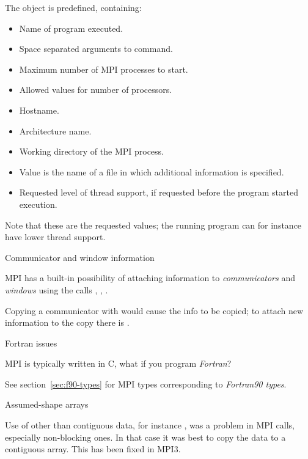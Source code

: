 The object  is predefined, containing:
\begin{itemize}
\item {}
  Name of program executed.
\item  {}
  Space separated arguments to command.
\item  {}
  Maximum number of MPI processes to start.
\item   {}
  Allowed values for number of processors.
\item   {}
  Hostname.
\item   {}
  Architecture name.
\item   {}
  Working directory of the MPI process.
\item   {}
  Value is the name of a file in which additional information is specified.
\item   {}
  Requested level of thread support, if requested before the program started execution.
\end{itemize}
Note that these are the requested values; the running program can for instance
have lower thread support.

 {Communicator and window information}

MPI has a built-in possibility of attaching information to
\emph{communicators}
and
\emph{windows}
using the calls
,
,
.

Copying a communicator with  would cause
the info to be copied; to attach new information to the copy there is
.

 {Fortran issues}
\label{sec:mpi-fortran}

MPI is typically written in C, what if you program \emph{Fortran}?

See section~\ref{sec:f90-types} for MPI types corresponding to
\emph{Fortran90 types}.

 {Assumed-shape arrays}

Use of other than contiguous data, for instance , was a
problem in MPI calls, especially non-blocking ones. In that case it
was best to copy the data to a contiguous array. This has been fixed
in MPI3.

